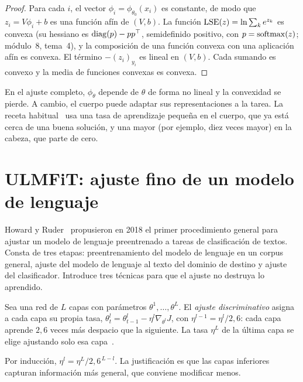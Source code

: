 \begin{proof}
Para cada $i$, el vector $\phi_i=\phi_{\theta_0}(x_i)$ es constante, de modo que $z_i=V\phi_i+b$ es una función afín de $(V,b)$. La función $\operatorname{LSE}(z)=\ln\sum_k e^{z_k}$ es convexa (su hessiano es $\operatorname{diag}(p)-pp^{\top}$, semidefinido positivo, con $p=\operatorname{softmax}(z)$; módulo~8, tema~4), y la composición de una función convexa con una aplicación afín es convexa. El término $-(z_i)_{y_i}$ es lineal en $(V,b)$. Cada sumando es convexo y la media de funciones convexas es convexa.
\end{proof}

En el ajuste completo, $\phi_\theta$ depende de $\theta$ de forma no lineal y la convexidad se pierde. A cambio, el cuerpo puede adaptar sus representaciones a la tarea. La receta habitual~\cite[§14.2]{d2l} usa una tasa de aprendizaje pequeña en el cuerpo, que ya está cerca de una buena solución, y una mayor (por ejemplo, diez veces mayor) en la cabeza, que parte de cero.

\section{ULMFiT: ajuste fino de un modelo de lenguaje}

Howard y Ruder~\cite{howard-ruder} propusieron en 2018 el primer procedimiento general para ajustar un modelo de lenguaje preentrenado a tareas de clasificación de textos. Consta de tres etapas: preentrenamiento del modelo de lenguaje en un corpus general, ajuste del modelo de lenguaje al texto del dominio de destino y ajuste del clasificador. Introduce tres técnicas para que el ajuste no destruya lo aprendido.

\begin{definicion}\label{def:discriminativas}
Sea una red de $L$ capas con parámetros $\theta^{1},\dots,\theta^{L}$. El \emph{ajuste discriminativo} asigna a cada capa su propia tasa, $\theta^{l}_t=\theta^{l}_{t-1}-\eta^{l}\nabla_{\theta^{l}}J$, con $\eta^{l-1}=\eta^{l}/2{,}6$: cada capa aprende $2{,}6$ veces más despacio que la siguiente. La tasa $\eta^{L}$ de la última capa se elige ajustando solo esa capa~\cite[§3.2]{howard-ruder}.
\end{definicion}

Por inducción, $\eta^{l}=\eta^{L}/2{,}6^{\,L-l}$. La justificación es que las capas inferiores capturan información más general, que conviene modificar menos.

